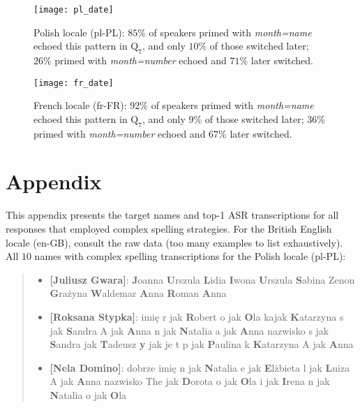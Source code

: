 \documentclass[11pt]{article}
\begin{document}
{\begin{figure}[h!]
\centering
\texttt{[image: pl\_date]}
\caption{Polish locale (pl-PL):
$85\%$ of speakers primed with \textit{month=name}
echoed this pattern in $\text{Q}_7$,
and only $10\%$ of those switched later;
$26\%$ primed with \textit{month=number} echoed and $71\%$ later switched.}
\end{figure}



\begin{figure}[h!]
\centering
\texttt{[image: fr\_date]}
\caption{
French locale (fr-FR):
$92\%$ of speakers primed with \textit{month=name}
echoed this pattern in $\text{Q}_7$,
and only $9\%$ of those switched later;
$36\%$ primed with \textit{month=number} echoed and $67\%$ later switched.}
\end{figure}





\section{Appendix}
\label{appendix-nato}

This appendix
presents the target names and top-1 ASR transcriptions
for all responses that employed complex spelling strategies.
For the British English locale (en-GB), consult the raw data (too many examples to list exhaustively).
All $10$ names with complex spelling transcriptions for the Polish locale (pl-PL):
\begin{quote}
{\small
\begin{itemize}[align=left,leftmargin=5pt,rightmargin=-10pt]
\item \textbf{[Juliusz Gwara]}: \textbf{J}oanna \textbf{U}rszula \textbf{L}idia \textbf{I}wona \textbf{U}rszula \textbf{S}abina Zenon \textbf{G}rażyna \textbf{W}aldemar \textbf{A}nna \textbf{R}oman \textbf{A}nna

\item \textbf{[Roksana Stypka]}: imię r jak \textbf{R}obert o jak \textbf{O}la kajak \textbf{K}atarzyna s jak \textbf{S}andra A jak \textbf{A}nna n jak \textbf{N}atalia a jak \textbf{A}nna nazwisko s jak \textbf{S}andra jak \textbf{T}adeusz \textbf{y} jak je t p jak \textbf{P}aulina k \textbf{K}atarzyna A jak \textbf{A}nna

\item \textbf{[Nela Domino]}: dobrze imię n jak \textbf{N}atalia e jak \textbf{E}lżbieta l jak \textbf{L}uiza A jak \textbf{A}nna nazwisko The jak \textbf{D}orota o jak \textbf{O}la i jak \textbf{I}rena n jak \textbf{N}atalia o jak \textbf{O}la


\end{itemize}}
\end{quote}}
\end{document}
